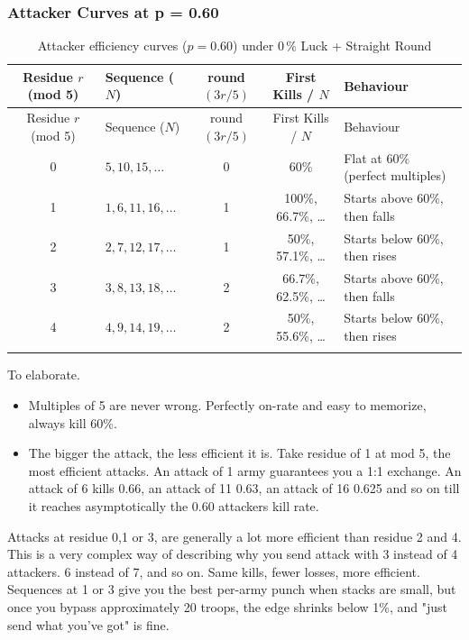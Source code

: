 \subsubsection{Attacker Curves at p = 0.60}

\small
\begin{longtable}{|c|l|c|c|l|}
\hline
\rowcolor{Baby_Blue}
Residue $r$ (mod 5) & Sequence ($N$) & round$(3r/5)$ & First Kills / $N$ & Behaviour \\ 
\hline\hline
\endfirsthead
\hline
\rowcolor{Baby_Blue}
Residue $r$ (mod 5) & Sequence ($N$) & round$(3r/5)$ & First Kills / $N$ & Behaviour \\ 
\hline\hline
\endhead
0 & $5,10,15,\dots$ & 0 & 60\% & Flat at 60\% (perfect multiples) \\ \hline
1 & $1,6,11,16,\dots$ & 1 & 100\%, 66.7\%, \dots & Starts above 60\%, then falls \\ \hline
2 & $2,7,12,17,\dots$ & 1 & 50\%, 57.1\%, \dots & Starts below 60\%, then rises \\ \hline
3 & $3,8,13,18,\dots$ & 2 & 66.7\%, 62.5\%, \dots & Starts above 60\%, then falls \\ \hline
4 & $4,9,14,19,\dots$ & 2 & 50\%, 55.6\%, \dots & Starts below 60\%, then rises \\ \hline
\caption{Attacker efficiency curves ($p = 0.60$) under 0\,\% Luck + Straight Round}
\label{table:attackerResidue}
\end{longtable}
\normalsize

To elaborate.
\begin{itemize}
    \item Multiples of 5 are never wrong. Perfectly on-rate and easy to memorize, always kill 60\%.
    \item The bigger the attack, the less efficient it is. Take residue of 1 at mod 5, the most efficient attacks. An attack of 1 army guarantees you a 1:1 exchange. An attack of 6 kills 0.66, an attack of 11 0.63, an attack of 16 0.625 and so on till it reaches asymptotically the 0.60 attackers kill rate.
\end{itemize}
Attacks at residue 0,1 or 3, are generally a lot more efficient than residue 2 and 4. This is a very complex way of describing why you send attack with 3 instead of 4 attackers. 6 instead of 7, and so on. Same kills, fewer losses, more efficient. Sequences at 1 or 3 give you the best per-army punch when stacks are small, but once you bypass approximately 20 troops, the edge shrinks below 1\%, and "just send what you've got" is fine.

